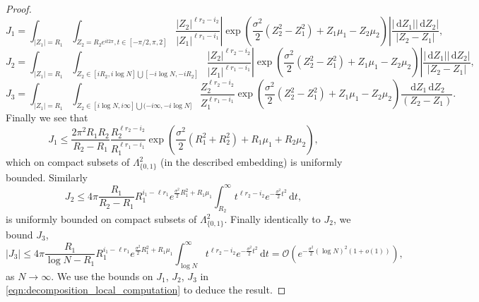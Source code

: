 \documentclass[11pt]{article}
\theoremstyle{plain}
\theoremstyle{definition}
\numberwithin{equation}{section}
\renewcommand{\d}{\,\mathrm{d}}
\begin{document}
\begin{proof}
\begin{equation}
J_1= \int_{|Z_1|=R_1}\int_{Z_2=R_2e^{it2\pi}, t\in[-\pi/2,\pi,2]}
\frac{|Z_2|^{\ell r_2-i_2}}{|Z_1|^{\ell r_1-i_1}}\left|\exp\left(\frac{\sigma^2}{2}(Z_2^2-Z_1^2)+Z_1\mu_1-Z_2\mu_2\right)\right|
\frac{|\d Z_1||\d Z_2|}{|Z_2-Z_1|},
\end{equation}
\begin{equation}
J_2=  \int_{|Z_1|=R_1}\int_{Z_2\in[iR_2, i\log N]\bigcup [-i\log N, -iR_2]} 
\frac{|Z_2|^{\ell r_2-i_2}}{|Z_1|^{\ell r_1-i_1}}\left|\exp\left(\frac{\sigma^2}{2}(Z_2^2-Z_1^2)+Z_1\mu_1-Z_2\mu_2\right)\right|
\frac{|\d Z_1||\d Z_2|}{|Z_2-Z_1|},
\end{equation}
\begin{equation}
J_3=\int_{|Z_1|=R_1}\int_{Z_2\in[i\log N, i\infty]\bigcup (-i\infty, -i\log N]} 
\frac{Z_2^{\ell r_2-i_2}}{Z_1^{\ell r_1-i_1}}\exp{\left(\frac{\sigma^2}{2}(Z_2^2-Z_1^2)+Z_1\mu_1-Z_2\mu_2\right)}
\frac{\d Z_1\d Z_2}{(Z_2-Z_1)}.
\end{equation}
%
%
%
Finally we see that
\begin{equation}
J_1\leq \frac{2\pi^2 R_1R_2}{R_2-R_1} \frac{R_2^{\ell r_2-i_2}}{R_1^{\ell r_1-i_1}}
\exp\left(\frac{\sigma^2}{2}(R_1^2+R_2^2)+R_1\mu_1+R_2\mu_2\right), 
\end{equation}
which on compact subsets of $\Lambda_{\{0,1\}}^2$ (in the described embedding) is uniformly bounded. Similarly
\begin{equation}
J_2\leq 4\pi \frac{R_1}{R_2-R_1} R_1^{i_1-\ell r_1}e^{\frac{\sigma^2}{2} R_1^2+R_1\mu_1}\int_{R_2}^{\infty} t^{\ell r_2-i_2} e^{-\frac{\sigma^2}{2} t^2}\d t,
\end{equation}
is uniformly bounded on compact subsets of $\Lambda_{\{0,1\}}^2$. Finally identically to $J_2$, we bound $J_3$,
\begin{equation}
\left|J_3\right|
\leq 4\pi \frac{R_1}{\log N-R_1} R_1^{i_1-\ell r_1}
e^{\frac{\sigma^2}{2} R_1^2+R_1\mu_1}
\int_{\log N}^{\infty} t^{\ell r_2-i_2} e^{-\frac{\sigma^2}{2} t^2}\d t= \mathcal{O}\left(e^{-\frac{\sigma^2}{2} (\log N)^2(1+o(1))}\right),
\end{equation}
 as $N\rightarrow\infty$. We use the bounds on $J_1$, $J_2$, $J_3$ in \eqref{eqn:decomposition_local_computation} to deduce the result. 
\end{proof}
\end{document}
